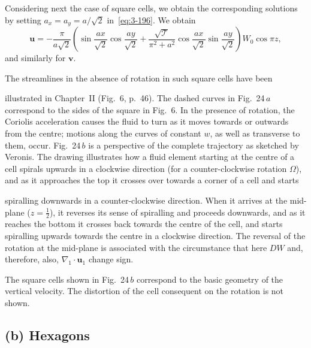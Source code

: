Considering next the case of square cells, we obtain the corresponding solutions by setting $a_x = a_y = a/\sqrt{2}$ in~\eqref{eq:3-196}. We obtain
\begin{equation}\label{eq:3-204}
\mathbf{u} = -\frac{\pi}{a\sqrt{2}}\!\left(\sin\frac{ax}{\sqrt{2}}\cos\frac{ay}{\sqrt{2}} + \frac{\sqrt{\mathscr{T}}}{\pi^2 + a^2}\cos\frac{ax}{\sqrt{2}}\sin\frac{ay}{\sqrt{2}}\right)\!W_0\cos\pi z,
\end{equation}
and similarly for $\mathbf{v}$.

The streamlines in the absence of rotation in such square cells have been


\noindent illustrated in Chapter~II (Fig.~6, p.~46). The dashed curves in Fig.~24\,$a$ correspond to the sides of the square in Fig.~6. In the presence of rotation, the Coriolis acceleration causes the fluid to turn as it moves towards or outwards from the centre; motions along the curves of constant $w$, as well as transverse to them, occur. Fig.~24\,$b$ is a perspective of the complete trajectory as sketched by Veronis. The drawing illustrates how a fluid element starting at the centre of a cell spirals upwards in a clockwise direction (for a counter-clockwise rotation $\Omega$), and as it approaches the top it crosses over towards a corner of a cell and starts


\noindent spiralling downwards in a counter-clockwise direction. When it arrives at the mid-plane ($z = \frac{1}{2}$), it reverses its sense of spiralling and proceeds downwards, and as it reaches the bottom it crosses back towards the centre of the cell, and starts spiralling upwards towards the centre in a clockwise direction. The reversal of the rotation at the mid-plane is associated with the circumstance that here $DW$ and, therefore, also, $\nabla_1\cdot\mathbf{u}_1$ change sign.

The square cells shown in Fig.~24\,$b$ correspond to the basic geometry of the vertical velocity. The distortion of the cell consequent on the rotation is not shown.

\subsection*{(b) Hexagons}

